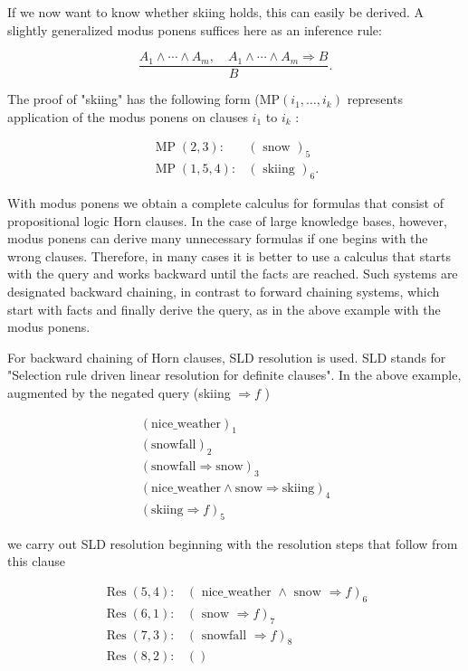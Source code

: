 \documentclass[10pt]{book}
\begin{document}
If we now want to know whether skiing holds, this can easily be derived. A slightly generalized modus ponens suffices here as an inference rule:

$$
\frac{A_{1} \wedge \cdots \wedge A_{m}, \quad A_{1} \wedge \cdots \wedge A_{m} \Rightarrow B}{B} .
$$

The proof of "skiing" has the following form ($\mathrm{MP}(i_{1}, \ldots, i_{k})$ represents application of the modus ponens on clauses $i_{1}$ to $i_{k}$ :

$$
\begin{array}{ll}
\operatorname{MP}(2,3): & (\text { snow })_{5} \\
\operatorname{MP}(1,5,4): & (\text { skiing })_{6} .
\end{array}
$$

With modus ponens we obtain a complete calculus for formulas that consist of propositional logic Horn clauses. In the case of large knowledge bases, however, modus ponens can derive many unnecessary formulas if one begins with the wrong clauses. Therefore, in many cases it is better to use a calculus that starts with the query and works backward until the facts are reached. Such systems are designated backward chaining, in contrast to forward chaining systems, which start with facts and finally derive the query, as in the above example with the modus ponens.

For backward chaining of Horn clauses, SLD resolution is used. SLD stands for "Selection rule driven linear resolution for definite clauses". In the above example, augmented by the negated query (skiing $\Rightarrow f$ )

\[
\begin{array}{l}
(\text{nice\_weather})_{1}\\
(\text{snowfall})_{2}\\
(\text{snowfall} \Rightarrow \text{snow})_{3}\\
(\text{nice\_weather} \wedge \text{snow} \Rightarrow \text{skiing})_{4}\\
(\text{skiing} \Rightarrow f)_{5}
\end{array}
\]

we carry out SLD resolution beginning with the resolution steps that follow from this clause

$$
\begin{array}{ll}
\operatorname{Res}(5,4): & (\text { nice\_weather } \wedge \text { snow } \Rightarrow f)_{6} \\
\operatorname{Res}(6,1): & (\text { snow } \Rightarrow f)_{7} \\
\operatorname{Res}(7,3): & (\text { snowfall } \Rightarrow f)_{8} \\
\operatorname{Res}(8,2): & ()
\end{array}
$$
\end{document}

